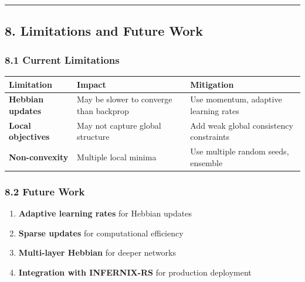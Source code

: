 \documentclass[
  11pt,
  a4paper,
]{article}
\providecommand{\tightlist}{%
  \setlength{\itemsep}{0pt}\setlength{\parskip}{0pt}}
\begin{document}
\begin{center}\rule{0.5\linewidth}{0.5pt}\end{center}

\subsection{8. Limitations and Future
Work}\label{limitations-and-future-work}

\subsubsection{8.1 Current Limitations}\label{current-limitations}

\begin{longtable}[]{@{}
  >{\raggedright\arraybackslash}p{}
  >{\raggedright\arraybackslash}p{}
  >{\raggedright\arraybackslash}p{}@{}}
\toprule\noalign{}
\begin{minipage}[b]{\linewidth}\raggedright
Limitation
\end{minipage} & \begin{minipage}[b]{\linewidth}\raggedright
Impact
\end{minipage} & \begin{minipage}[b]{\linewidth}\raggedright
Mitigation
\end{minipage} \\
\midrule\noalign{}
\endhead
\bottomrule\noalign{}
\endlastfoot
\textbf{Hebbian updates} & May be slower to converge than backprop & Use
momentum, adaptive learning rates \\
\textbf{Local objectives} & May not capture global structure & Add weak
global consistency constraints \\
\textbf{Non-convexity} & Multiple local minima & Use multiple random
seeds, ensemble \\
\end{longtable}

\subsubsection{8.2 Future Work}\label{future-work}

\begin{enumerate}
\def\labelenumi{\arabic{enumi}.}
\tightlist
\item
  \textbf{Adaptive learning rates} for Hebbian updates
\item
  \textbf{Sparse updates} for computational efficiency
\item
  \textbf{Multi-layer Hebbian} for deeper networks
\item
  \textbf{Integration with INFERNIX-RS} for production deployment
\end{enumerate}
\end{document}
